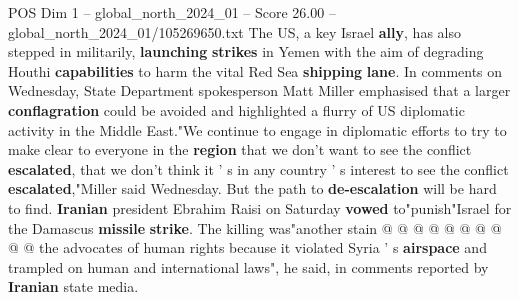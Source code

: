 \begin{textsample}{POS Dim 1 – global\_north\_2024\_01 – Score 26.00 – global\_north\_2024\_01/105269650.txt}
The US, a key Israel \textbf{ally}, has also stepped in militarily, \textbf{launching} \textbf{strikes} in Yemen with the aim of degrading Houthi \textbf{capabilities} to harm the vital Red Sea \textbf{shipping} \textbf{lane}.
In comments on Wednesday, State Department spokesperson Matt Miller emphasised that a larger \textbf{conflagration} could be avoided and highlighted a flurry of US diplomatic activity in the Middle East."We continue to engage in diplomatic efforts to try to make clear to everyone in the \textbf{region} that we don't want to see the conflict \textbf{escalated}, that we don't think it ' s in any country ' s interest to see the conflict \textbf{escalated},"Miller said Wednesday.
But the path to \textbf{de-escalation} will be hard to find. \textbf{Iranian} president Ebrahim Raisi on Saturday \textbf{vowed} to"punish"Israel for the Damascus \textbf{missile} \textbf{strike}.
The killing was"another stain @ @ @ @ @ @ @ @ @ @ the advocates of human rights because it violated Syria ' s \textbf{airspace} and trampled on human and international laws", he said, in comments reported by \textbf{Iranian} state media.

\end{textsample}
